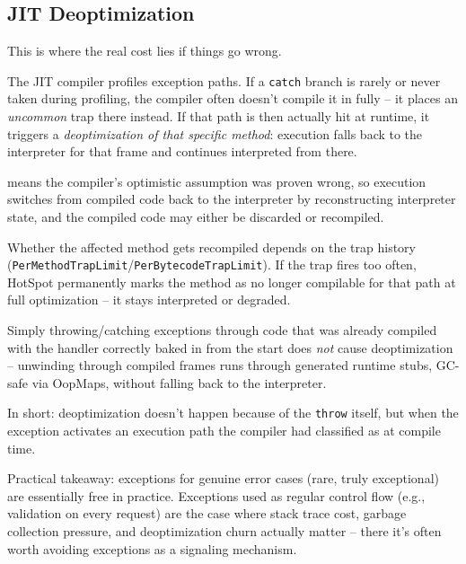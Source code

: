 \subsection{JIT Deoptimization}\label{sec:JITDeopt}
This is where the real cost lies if things go wrong.
 
The JIT compiler profiles exception paths. If a \lstinline|catch| branch is rarely or never taken during profiling, the compiler often doesn't compile it in fully – it places an \textit{uncommon} trap there instead. If that path is then actually hit at runtime, it triggers a \textit{deoptimization of that specific method}: execution falls back to the interpreter for that frame and continues interpreted from there.

 means the compiler's optimistic assumption was proven wrong, so execution switches from compiled code back to the interpreter by reconstructing interpreter state, and the compiled code may either be discarded or recompiled.

Whether the affected method gets recompiled depends on the trap history (\texttt{PerMethodTrapLimit}/\texttt{PerBytecodeTrapLimit}). If the trap fires too often, HotSpot permanently marks the method as no longer compilable for that path at full optimization – it stays interpreted or degraded.

Simply throwing/catching exceptions through code that was already compiled with the handler correctly baked in from the start does \textit{not} cause deoptimization – unwinding through compiled frames runs through generated runtime stubs, GC-safe via OopMaps, without falling back to the interpreter.

In short: deoptimization doesn't happen because of the \lstinline|throw| itself, but when the exception activates an execution path the compiler had classified as  at compile time.

Practical takeaway: exceptions for genuine error cases (rare, truly exceptional) are essentially free in practice. Exceptions used as regular control flow (e.g., validation on every request) are the case where stack trace cost, garbage collection pressure, and deoptimization churn actually matter – there it's often worth avoiding exceptions as a signaling mechanism.


